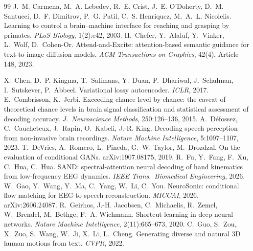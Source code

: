 \documentclass[11pt]{article}
\begin{document}
\begin{thebibliography}{99}
 J.~M. Carmena, M.~A. Lebedev, R.~E. Crist, J.~E. O'Doherty, D.~M. Santucci, D.~F. Dimitrov, P.~G. Patil, C.~S. Henriquez, M.~A.~L. Nicolelis. Learning to control a brain--machine interface for reaching and grasping by primates. \emph{PLoS Biology}, 1(2):e42, 2003.
 H.~Chefer, Y.~Alaluf, Y.~Vinker, L.~Wolf, D.~Cohen-Or. Attend-and-Excite: attention-based semantic guidance for text-to-image diffusion models. \emph{ACM Transactions on Graphics}, 42(4), Article 148, 2023.

 X.~Chen, D.~P. Kingma, T.~Salimans, Y.~Duan, P.~Dhariwal, J.~Schulman, I.~Sutskever, P.~Abbeel. Variational lossy autoencoder. \emph{ICLR}, 2017.
 E.~Combrisson, K.~Jerbi. Exceeding chance level by chance: the caveat of theoretical chance levels in brain signal classification and statistical assessment of decoding accuracy. \emph{J.\ Neuroscience Methods}, 250:126--136, 2015.
 A.~D\'efossez, C.~Caucheteux, J.~Rapin, O.~Kabeli, J.-R. King. Decoding speech perception from non-invasive brain recordings. \emph{Nature Machine Intelligence}, 5:1097--1107, 2023.
 T.~DeVries, A.~Romero, L.~Pineda, G.~W. Taylor, M.~Drozdzal. On the evaluation of conditional GANs. arXiv:1907.08175, 2019.
 R.~Fu, Y.~Fang, F.~Xu, C.~Hua, C.~Hua. SAND: spectral-attention neural decoding of hand kinematics from low-frequency EEG dynamics. \emph{IEEE Trans.\ Biomedical Engineering}, 2026.
 W.~Gao, Y.~Wang, Y.~Ma, C.~Yang, W.~Li, C.~You. NeuroSonic: conditional flow matching for EEG-to-speech reconstruction. \emph{MICCAI}, 2026. arXiv:2606.24087.
 R.~Geirhos, J.-H. Jacobsen, C.~Michaelis, R.~Zemel, W.~Brendel, M.~Bethge, F.~A. Wichmann. Shortcut learning in deep neural networks. \emph{Nature Machine Intelligence}, 2(11):665--673, 2020.
 C.~Guo, S.~Zou, X.~Zuo, S.~Wang, W.~Ji, X.~Li, L.~Cheng. Generating diverse and natural 3D human motions from text. \emph{CVPR}, 2022.


\end{thebibliography}
\end{document}
